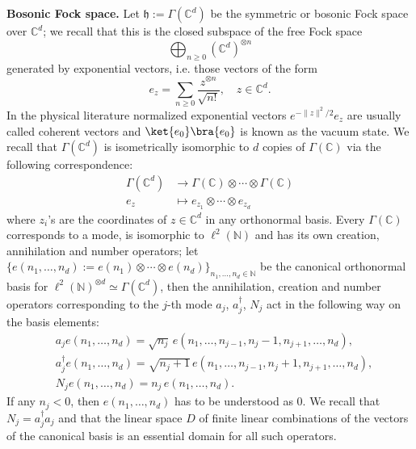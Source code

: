 \documentclass[preprint]{elsarticle}
\theoremstyle{definition}
\def\nn{\mathbb{N}}
\def\CC{\mathbb{C}}
\def\FS{\Gamma(\CC^d)}
\begin{document}
\textbf{Bosonic Fock space.} Let $\mathfrak{h}:=\FS$ be the symmetric or bosonic Fock space over $\CC^d$; we recall that this is the closed subspace of the free Fock space
$$
\bigoplus_{n\geq 0} (\CC^d)^{\otimes n}
$$
generated by exponential vectors, i.e. those vectors of the form
$$
e_z=\sum_{n \geq 0} \frac{z^{\otimes n}}{\sqrt{n!}}, \quad z \in \CC^d.
$$
In the physical literature normalized exponential vectors $e^{-\|z\|^2/2}e_z$ are usually called coherent vectors and $\ket{e_0}\bra{e_0}$ is known as the vacuum state. We recall that $\FS$ is isometrically isomorphic to $d$ copies of $\Gamma(\CC)$ via the following correspondence:
\begin{align*}
    \FS &\rightarrow \Gamma(\CC) \otimes \cdots \otimes \Gamma(\CC)\\
    e_z &\mapsto e_{z_1} \otimes \cdots \otimes e_{z_d}
\end{align*}
where $z_i$'s are the coordinates of $z \in \CC^d$ in any orthonormal basis. Every $\Gamma(\CC)$ corresponds to a mode, is isomorphic to $\ell^2(\nn)$ and has its own creation, annihilation and number operators; let $\{e(n_1,\dots,n_d):=e(n_1) \otimes \cdots \otimes e(n_d)\}_{n_1,\dots, n_d \in \nn}$ be the canonical orthonormal basis for $\ell^2(\mathbb{N})^{\otimes d}\simeq \FS$, then the annihilation, creation and number operators corresponding to the $j$-th mode $a_j$, $a^\dagger_j$, $N_j$ act in the following way on the basis elements:
\begin{align*}
&a_je(n_1,\dots,n_d)=\sqrt{n_j}\,e(n_1,\dots,n_{j-1}, n_j-1, n_{j+1}, \dots , n_d),\\
&a^\dagger_je(n_1,\dots,n_d)=\sqrt{n_j+1}\,e(n_1,\dots,n_{j-1}, n_j+1, n_{j+1}, \dots,  n_d),\\
&N_je(n_1,\dots,n_d)=n_j \,e(n_1, \dots,  n_d).
\end{align*}
If any $n_j<0$, then $e(n_1, \dots, n_d)$ has to be understood as $0$. We recall that $N_j=a_j^\dagger a_j$ and that the linear space $D$ of finite linear combinations of the vectors of the canonical basis is an essential domain for all such operators.
\end{document}
